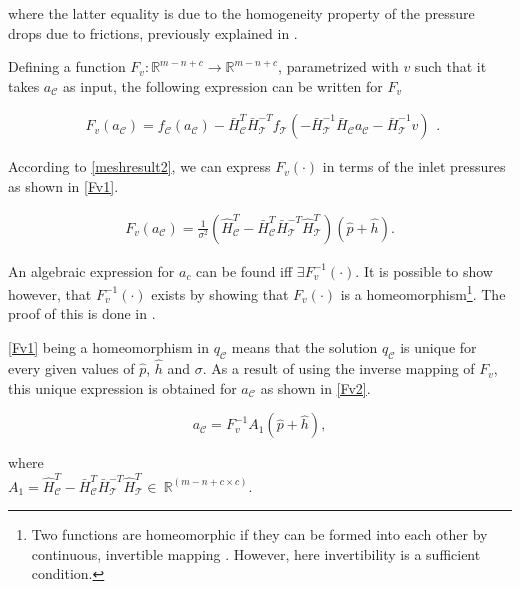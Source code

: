where the latter equality is due to the homogeneity property of the pressure drops due to frictions, previously explained in .

Defining a function $F_v : \mathbb{R}^{m-n+c} \rightarrow \mathbb{R}^{m-n+c}$, parametrized with $v$ such that it takes $a_{\mathcal{C}}$ as input, the following expression can be written for $F_v$

\begin{equation}
\begin{split}
\label{Fv}
F_v(a_{\mathcal{C}}) = f_{\mathcal{C}}(a_{\mathcal{C}}) -\bar{H}^T_{\mathcal{C}}\bar{H}^{-T}_{\mathcal{T}} f_{\mathcal{T}}(-\bar{H}^{-1}_{\mathcal{T}} \bar{H}_{\mathcal{C}} a_{\mathcal{C}} - \bar{H}^{-1}_{\mathcal{T}} v) 
\end{split}.
\end{equation}

According to \eqref{meshresult2}, we can express $F_v(\cdot)$ in terms of the inlet pressures as shown in \eqref{Fv1}.

\begin{equation}
\begin{split}
\label{Fv1}
F_v(a_{\mathcal{C}}) = \frac{1}{\sigma^2} (\hat{H}^T_{\mathcal{C}} -\bar{H}^T_{\mathcal{C}}\bar{H}^{-T}_{\mathcal{T}}\hat{H}^T_{\mathcal{T}})(\hat{p} + \hat{h}).
\end{split}
\end{equation}

An algebraic expression for $a_c$ can be found iff $\exists F_v^{-1}(\cdot)$. It is possible to show however, that $F_v^{-1}(\cdot)$ exists by showing that $F_v(\cdot)$ is a homeomorphism\footnote{Two functions are homeomorphic if they can be formed into each other by continuous, invertible mapping \cite{krantz2012handbook}. However, here invertibility is a sufficient condition.}. The proof of this is done in \cite{oneinput_paper}.  

\eqref{Fv1} being a homeomorphism in $q_{\mathcal{C}}$ means that the solution $q_{\mathcal{C}}$ is unique for every given values of $\hat{p}$, $\hat{h}$ and $\sigma$. As a result of using the inverse mapping of $F_v$, this unique expression is obtained for $a_{\mathcal{C}}$ as shown in \eqref{Fv2}.

\begin{equation}
\label{Fv2}
a_{\mathcal{C}} = F_v^{-1} A_1(\hat{p} + \hat{h}),
\end{equation}

  \begin{minipage}[t]{0.60\textwidth}
where\\
\hspace*{8mm} $A_1 = \hat{H}^T_{\mathcal{C}} -\bar{H}^T_{\mathcal{C}}\bar{H}^{-T}_{\mathcal{T}}\hat{H}^T_{\mathcal{T}}\in \: \mathbb{R}^{(m-n+c \times c)}$. 
\end{minipage}

